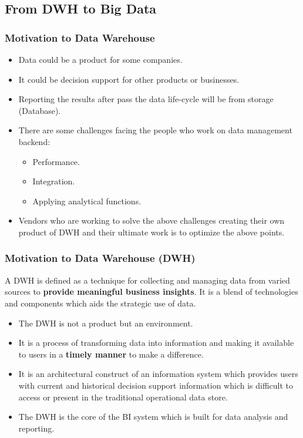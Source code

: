

\subsection{From DWH to Big Data}
\begin{frame}
\frametitle{Motivation to Data Warehouse}
\begin{itemize}[<+->]
	\item Data could be a product for some companies.
	\item It could be decision support for other products or businesses.
	\item Reporting the results after pass the data life-cycle will be from storage (Database).
	\item There are some challenges facing the people who work on data management backend:
	\begin{itemize}
		\item Performance.
		\item Integration.
		\item Applying analytical functions. %
	\end{itemize}
	\item Vendors who are working to solve the above challenges creating their own product of DWH and their ultimate work is to optimize the above points.
\end{itemize}
\end{frame}

\begin{frame}
\frametitle{Motivation to Data Warehouse (DWH)}

\begin{definition} A DWH is defined as a technique for collecting and managing data from varied sources to \textbf{provide meaningful business insights}. It is a blend of technologies and components which aids the strategic use of data.\footnotemark
\end{definition}
\begin{itemize}
	\item The DWH is not a product but an environment.
	\item It is a process of transforming data into information and making it available to users in a \textbf{timely manner} to make a difference.
	\item It is an architectural construct of an information system which provides users with current and historical decision support information which is difficult to access or present in the traditional operational data store.
	\item The DWH is the core of the BI system which is built for data analysis and reporting.
\end{itemize}
\end{frame}

